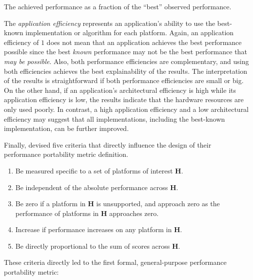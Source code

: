 \begin{definition}\label{def:app_eff}
    The achieved performance as a fraction of the \enquote{best} observed performance. 
\end{definition}

The \textit{application efficiency} represents an application's ability to use the best-known implementation or algorithm for each platform. 
Again, an application efficiency of $1$ does not mean that an application achieves the best performance possible since the best \textit{known} performance may not be the best performance that \textit{may be possible}.
Also, both performance efficiencies are complementary, and using both efficiencies achieves the best explainability of the results. 
The interpretation of the results is straightforward if both performance efficiencies are small or big.
On the other hand, if an application's architectural efficiency is high while its application efficiency is low, the results indicate that the hardware resources are only used poorly. 
In contrast, a high application efficiency and a low architectural efficiency may suggest that all implementations, including the best-known implementation, can be further improved. 

Finally, \citeauthor{pennycook_implications_2019} devised five criteria that directly influence the design of their performance portability metric definition.
\begin{definition}\label{def:pp_criteria}
\begin{enumerate}
    \item Be measured specific to a set of platforms of interest $\mathbf{H}$.
    \item Be independent of the absolute performance across $\mathbf{H}$.
    \item Be zero if a platform in $\mathbf{H}$ is unsupported, and approach zero as the performance of platforms in $\mathbf{H}$ approaches zero. 
    \item Increase if performance increases on any platform in $\mathbf{H}$.
    \item Be directly proportional to the sum of scores across $\mathbf{H}$.
\end{enumerate}
\end{definition}
These criteria directly led to the first formal, general-purpose performance portability metric:

